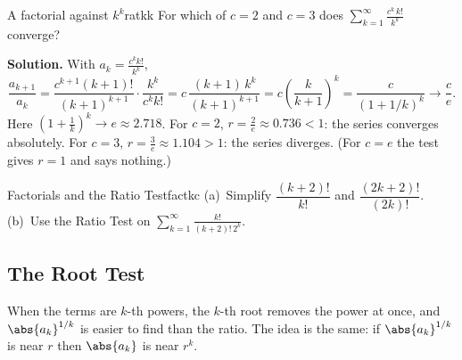 \documentclass[11pt]{article}
\begin{document}
\begin{exmp}{A factorial against $k^k$}{ratkk}
For which of $c=2$ and $c=3$ does $\displaystyle\sum_{k=1}^\infty\frac{c^k\,k!}{k^k}$ converge?

\textbf{Solution.} With $a_k=\frac{c^kk!}{k^k}$,
\[
\frac{a_{k+1}}{a_k}=\frac{c^{k+1}(k+1)!}{(k+1)^{k+1}}\cdot\frac{k^k}{c^kk!}=c\,\frac{(k+1)\,k^k}{(k+1)^{k+1}}=c\left(\frac k{k+1}\right)^k=\frac c{(1+1/k)^k}\to\frac ce .
\]
Here $\left(1+\frac1k\right)^k\to e\approx2.718$. For $c=2$, $r=\frac2e\approx0.736<1$: the series converges absolutely. For $c=3$, $r=\frac3e\approx1.104>1$: the series diverges. (For $c=e$ the test gives $r=1$ and says nothing.)
\end{exmp}

\begin{kc}{Factorials and the Ratio Test}{factkc}
(a)~Simplify $\dfrac{(k+2)!}{k!}$ and $\dfrac{(2k+2)!}{(2k)!}$. (b)~Use the Ratio Test on $\displaystyle\sum_{k=1}^\infty\frac{k!}{(k+2)!\,2^k}$.
\end{kc}

\subsection*{The Root Test}

When the terms are $k$-th powers, the $k$-th root removes the power at once, and $\abs{a_k}^{1/k}$ is easier to find than the ratio. The idea is the same: if $\abs{a_k}^{1/k}$ is near $r$ then $\abs{a_k}$ is near $r^k$.
\end{document}
